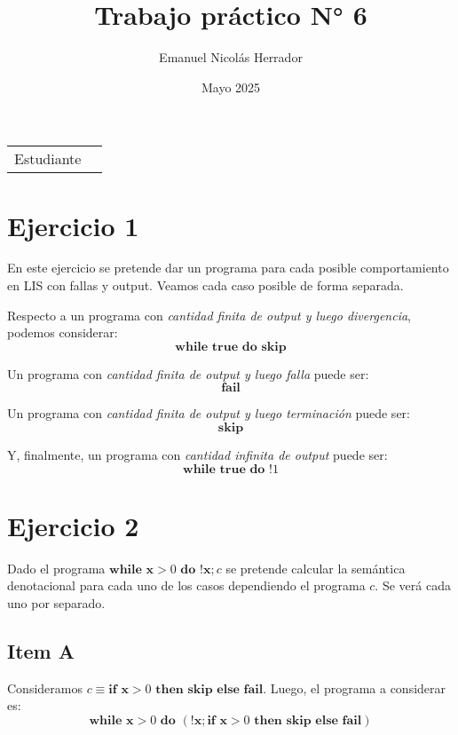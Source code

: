 \documentclass{article}
\title{Trabajo práctico N° 6}
\author{Emanuel Nicolás Herrador}
\date{Mayo 2025}
\newcommand{\x}{\textbf{x}}
\newcommand{\ctrue}{\textbf{true}}
\newcommand{\cskip}{\textbf{skip}}
\newcommand{\cif}[3]{\textbf{if }#1\textbf{ then }#2\textbf{ else }#3}
\newcommand{\cwhile}[2]{\textbf{while }#1\textbf{ do }#2}
\newcommand{\cfail}{\textbf{fail}}
\begin{document}
\maketitle

\noindent\begin{tabular}{@{}ll}
	Estudiante & \theauthor \\
\end{tabular}

\section*{Ejercicio 1}
En este ejercicio se pretende dar un programa para cada posible comportamiento en LIS con fallas y output.
Veamos cada caso posible de forma separada.

Respecto a un programa con \textit{cantidad finita de output y luego divergencia}, podemos considerar:
\begin{equation*}
  \cwhile{\ctrue}{\cskip}
\end{equation*}

Un programa con \textit{cantidad finita de output y luego falla} puede ser:
\begin{equation*}
  \cfail 
\end{equation*}

Un programa con \textit{cantidad finita de output y luego terminación} puede ser:
\begin{equation*}
  \cskip
\end{equation*}

Y, finalmente, un programa con \textit{cantidad infinita de output} puede ser:
\begin{equation*}
  \cwhile{\ctrue}{!1}
\end{equation*}

\section*{Ejercicio 2}
Dado el programa $\cwhile{\x>0}{!\x};c$ se pretende calcular la semántica denotacional para cada uno de los casos dependiendo el programa $c$.
Se verá cada uno por separado.

\subsection*{Item A}
Consideramos $c \equiv \cif{\x>0}{\cskip}{\cfail}$.
Luego, el programa a considerar es:
\begin{equation*}
  \cwhile{\x>0}{(!\x; \cif{\x>0}{\cskip}{\cfail})}
\end{equation*}
\end{document}
